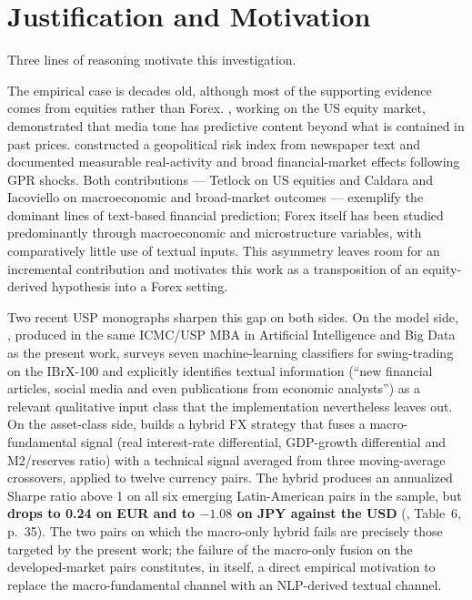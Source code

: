\section{Justification and Motivation} \label{sec:justification}

Three lines of reasoning motivate this investigation.

The empirical case is decades old, although most of the supporting evidence comes from equities rather than Forex. , working on the US equity market, demonstrated that media tone has predictive content beyond what is contained in past prices.  constructed a geopolitical risk index from newspaper text and documented measurable real-activity and broad financial-market effects following GPR shocks. Both contributions --- Tetlock on US equities and Caldara and Iacoviello on macroeconomic and broad-market outcomes --- exemplify the dominant lines of text-based financial prediction; Forex itself has been studied predominantly through macroeconomic and microstructure variables, with comparatively little use of textual inputs. This asymmetry leaves room for an incremental contribution and motivates this work as a transposition of an equity-derived hypothesis into a Forex setting.

Two recent USP monographs sharpen this gap on both sides. On the model side, , produced in the same ICMC/USP MBA in Artificial Intelligence and Big Data as the present work, surveys seven machine-learning classifiers for swing-trading on the IBrX-100 and explicitly identifies textual information (``new financial articles, social media and even publications from economic analysts'') as a relevant qualitative input class that the implementation nevertheless leaves out. On the asset-class side,  builds a hybrid FX strategy that fuses a macro-fundamental signal (real interest-rate differential, GDP-growth differential and M2/reserves ratio) with a technical signal averaged from three moving-average crossovers, applied to twelve currency pairs. The hybrid produces an annualized Sharpe ratio above 1 on all six emerging Latin-American pairs in the sample, but \textbf{drops to 0.24 on EUR and to $-1.08$ on JPY against the USD} (\citeauthor{vanhelden2021fx}, Table~6, p.~35). The two pairs on which the macro-only hybrid fails are precisely those targeted by the present work; the failure of the macro-only fusion on the developed-market pairs constitutes, in itself, a direct empirical motivation to replace the macro-fundamental channel with an NLP-derived textual channel.

